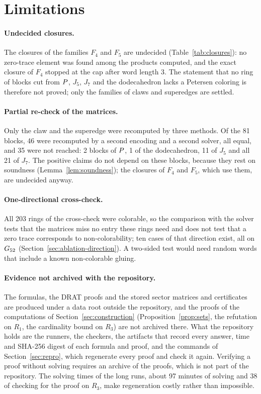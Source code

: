 \section{Limitations}\label{sec:limitations}

\paragraph{Undecided closures.} The closures of the families $F_4$ and $F_5$ are undecided (Table~\ref{tab:closures}): no zero-trace element was found among the products computed, and the
exact closure of $F_4$ stopped at the cap after word length 3. The statement that no ring of blocks cut from $P$, $J_5$, $J_7$ and the dodecahedron lacks a Petersen coloring is therefore not
proved; only the families of claws and superedges are settled.

\paragraph{Partial re-check of the matrices.} Only the claw and the superedge were recomputed by three methods. Of the 81 blocks, 46 were recomputed by a second encoding and a second solver, all equal, and
35 were not reached: 2 blocks of $P$, 1 of the dodecahedron, 11 of $J_5$ and all 21 of $J_7$. The positive claims do not depend on these blocks, because they rest on soundness
(Lemma~\ref{lem:soundness}); the closures of $F_4$ and $F_5$, which use them, are undecided anyway.

\paragraph{One-directional cross-check.} All 203 rings of the cross-check were colorable, so the comparison with the solver tests that the matrices miss no entry these rings need and does not test that a zero trace corresponds
to non-colorability; ten cases of that direction exist, all on $G_{52}$ (Section~\ref{sec:ablation-direction}). A two-sided test would need random words that include a known non-colorable gluing.

\paragraph{Evidence not archived with the repository.} The formulas, the DRAT proofs and the stored sector matrices and certificates are produced under a data root outside the repository, and the proofs of
the computations of Section~\ref{sec:construction} (Proposition~\ref{prop:sets}, the refutation on $R_1$, the cardinality bound on $R_3$) are not archived there. What the repository holds are the runners, the
checkers, the artifacts that record every answer, time and SHA-256 digest of each formula and proof, and the commands of Section~\ref{sec:repro}, which regenerate every proof and check it again. Verifying a proof
without solving requires an archive of the proofs, which is not part of the repository. The solving times of the long runs, about 97 minutes of solving and 38 of checking for the proof on $R_3$, make regeneration costly rather than impossible.

